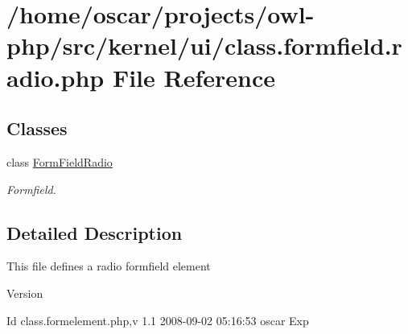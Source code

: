 \section{/home/oscar/projects/owl-\/php/src/kernel/ui/class.formfield.radio.php File Reference}
\label{class_8formfield_8radio_8php}
\subsection*{Classes}
\begin{DoxyCompactItemize}
\item 
class \hyperlink{classFormFieldRadio}{FormFieldRadio}
\begin{DoxyCompactList}\small\item\em Formfield. \item\end{DoxyCompactList}\end{DoxyCompactItemize}


\subsection{Detailed Description}
This file defines a radio formfield element \begin{DoxyVersion}{Version}

\end{DoxyVersion}
\begin{DoxyParagraph}{Id}
class.formelement.php,v 1.1 2008-\/09-\/02 05:16:53 oscar Exp 
\end{DoxyParagraph}
